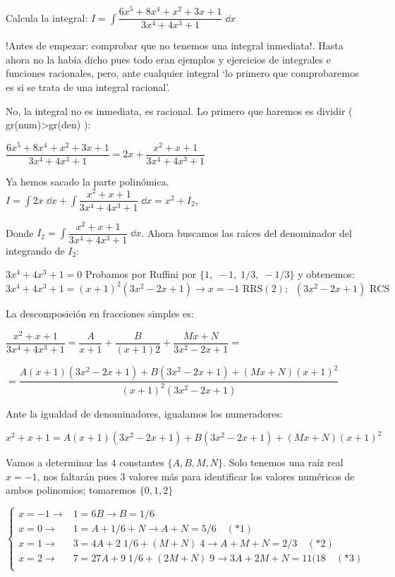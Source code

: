 {\begin{proofw}
\end{proofw}

\begin{ejre} Calcula la integral: $I= \displaystyle \int  \dfrac {6x^5+8x^4+x^2+3x+1}{3x^4+4x^3+1} \; \dd x$
	
\end{ejre}
\begin{proofw}\renewcommand{\qedsymbol}{$\diamond$}	 

 !Antes de empezar: comprobar que no tenemos una integral inmediata!. Hasta ahora no la había dicho pues todo eran ejemplos y ejercicios de integrales e funciones racionales, pero, ante cualquier integral `lo primero que comprobaremos es si se trata de una integral racional'. 

No, la integral no es inmediata, es racional. Lo primero que haremos es dividir ( gr(num)>gr(den) ):


$\dfrac {6x^5+8x^4+x^2+3x+1}{3x^4+4x^3+1} = 2x + \dfrac {x^2+x+1}{3x^4+4x^3+1} $

Ya hemos sacado la parte polinómica. $I=\displaystyle \int 2x \; \dd x + \int \dfrac {x^2+x+1}{3x^4+4x^3+1} \; \dd x= x^2 + I_2$,

Donde $I_2= \displaystyle \int \dfrac {x^2+x+1}{3x^4+4x^3+1} \; \dd x$. Ahora buscamos las raíces del denominador del integrando de $I_2$:

$3x^4+4x^3+1=0$ Probamos por Ruffini por $\{1,\; -1, \; 1/3, \; -1/3 \}$ y obtenemos: $3x^4+4x^3+1=(x+1)^2 (3x^2-2x+1) \to x=-1 \text{ RRS}(2); \; \; (3x^2-2x+1) \text { RCS}$

La descomposición en fracciones simples es: 

$\displaystyle \dfrac {x^2+x+1}{3x^4+4x^3+1} = \dfrac{A}{x+1} + \dfrac{B}{(x+1)2} + \dfrac{Mx+N}{3x^2-2x+1} =$

$=\displaystyle \dfrac {A(x+1)(3x^2-2x+1) + B (3x^2-2x+1) + (Mx+N)(x+1)^2}{(x+1)^2 (3x^2-2x+1)}$

Ante la igualdad de denominadores, igualamos los numeradores:

$x^2+x+1=A(x+1)(3x^2-2x+1) + B (3x^2-2x+1) + (Mx+N)(x+1)^2$

Vamos a determinar las $4$ constantes $\{A, B, M ,N \}$. Solo tenemos una raíz real $x=-1$, nos faltarán pues 3 valores más para identificar los valores numéricos de ambos polinomios; tomaremos $\{ 0, 1, 2\}$

$\begin{cases}
x=-1 \to  & 1=6B \to B=1/6  \\
x=0 \to   & 1=A+1/6+N \to A+N=5/6 \quad (*1) \\
x=1 \to   & 3=4A+2\; 1/6 + (M+N)\; 4 \to A+M+N=2/3 \quad (*2) \\
x=2 \to   & 7=27A+9\; 1/6 + (2M+N)\; 9 \to 3A+2M+N=11(18 \quad (*3) \\	
\end{cases}$



\end{proofw}}
